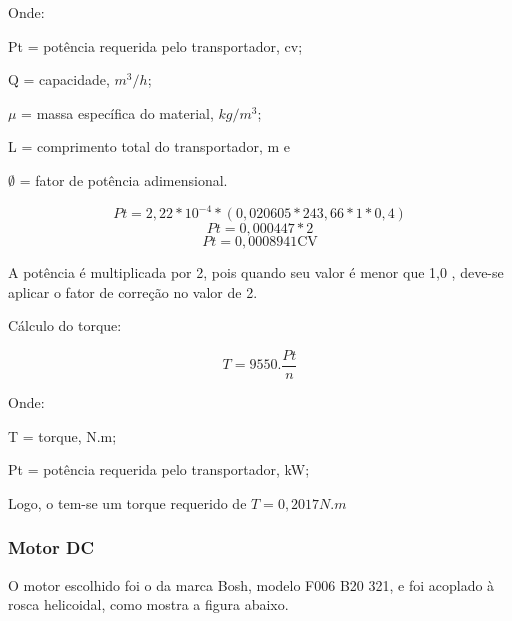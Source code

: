 Onde:

Pt = potência requerida pelo transportador, cv;

Q = capacidade, $m^3/h$;

$\mu$ = massa específica do material, $kg/m^3$;

L = comprimento total do transportador, m e

$\emptyset$ = fator de potência adimensional.


\begin{equation}
Pt = 2,22*10^{-4}*(0,020605*243,66*1*0,4)
\end{equation}
\begin{equation}
Pt = 0,000447*2
\end{equation}
\begin{equation}
Pt = 0,0008941 \text{CV}
\end{equation}


A potência é multiplicada por 2, pois quando seu valor é menor que 1,0 , deve-se aplicar o fator de correção no valor de 2.

Cálculo do torque:

\begin{equation}
T=9550.\frac{Pt}{n}
\end{equation}

Onde:

T = torque, N.m;

Pt = potência requerida pelo transportador, kW;

Logo, o tem-se um torque requerido de $T=0,2017N.m$

\subsubsection{Motor DC}

O motor escolhido foi o da marca Bosh, modelo F006 B20 321, e foi acoplado à rosca helicoidal, como mostra a figura abaixo.


